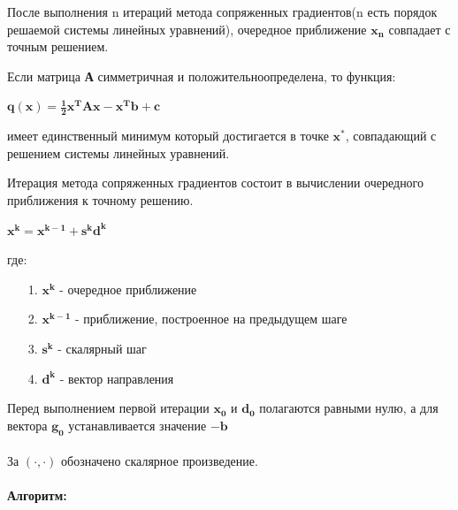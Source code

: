 \documentclass[12pt]{article}
\begin{document}
После выполнения n итераций метода сопряженных градиентов(n есть порядок решаемой системы линейных уравнений), очередное приближение $\mathbf{x_n}$ совпадает с точным решением.

Если матрица \textbf{А} симметричная и положительноопределена, то функция:\begin{center}
$\mathbf{q(x) = \frac{1}{2}x^TAx - x^Tb + c}$
\end{center}
имеет единственный минимум который достигается в точке $\mathbf{x^*}$, совпадающий с решением системы линейных уравнений.

Итерация метода сопряженных градиентов состоит в вычислении очередного приближения к точному решению.

\begin{center}
$\mathbf{x^k = x^{k-1} + s^kd^k}$
\end{center}
где:

\begin{itemize}
	\item[1.] $\mathbf{x^k}$ - очередное приближение
	\item[2.] $\mathbf{x^{k-1}}$ - приближение, построенное на предыдущем шаге
	\item[3.] $\mathbf{s^k}$ - скалярный шаг
	\item[4.] $\mathbf{d^k}$ - вектор направления
\end{itemize}

Перед выполнением первой итерации $\mathbf{x_0}$ и $\mathbf{d_0}$ полагаются равными нулю, а для вектора $\mathbf{g_0}$ устанавливается значение $\mathbf{-b}$\\\\
За $(\cdot,\cdot)$ обозначено скалярное произведение.\\\\
\textbf{Алгоритм:}
\end{document}
